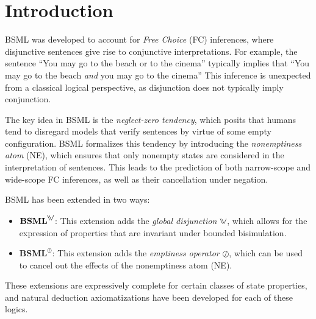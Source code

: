 
\section{Introduction}\label{sec:Introduction}

BSML was developed to account for \textit{Free Choice} (FC) inferences, where disjunctive sentences give rise to conjunctive interpretations. For example, the sentence ``You may go to the beach or to the cinema'' typically implies that ``You may go to the beach \textit{and} you may go to the cinema'' This inference is unexpected from a classical logical perspective, as disjunction does not typically imply conjunction.

The key idea in BSML is the \textit{neglect-zero tendency}, which posits that humans tend to disregard models that verify sentences by virtue of some empty configuration. BSML formalizes this tendency by introducing the \textit{nonemptiness atom} (NE), which ensures that only nonempty states are considered in the interpretation of sentences. This leads to the prediction of both narrow-scope and wide-scope FC inferences, as well as their cancellation under negation.

BSML has been extended in two ways:
\begin{itemize}
    \item \(\textbf{BSML}^{\inqdisj}\): This extension adds the \textit{global disjunction} \(\inqdisj\), which allows for the expression of properties that are invariant under bounded bisimulation.
    \item \(\textbf{BSML}^{\oslash}\): This extension adds the \textit{emptiness operator} \(\oslash\), which can be used to cancel out the effects of the nonemptiness atom (NE).
\end{itemize}

These extensions are expressively complete for certain classes of state properties, and natural deduction axiomatizations have been developed for each of these logics.